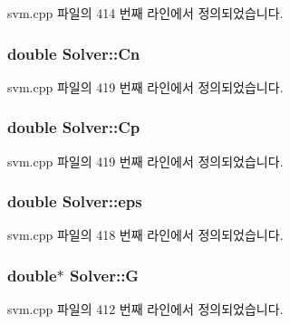 svm.\+cpp 파일의 414 번째 라인에서 정의되었습니다.

\hypertarget{class_solver_a38d741d194839fb445f982dd78e0b97b}{
\subsubsection[{Cn}]{\setlength{\rightskip}{0pt plus 5cm}double Solver\+::\+Cn\hspace{0.3cm}{\ttfamily [protected]}}}\label{class_solver_a38d741d194839fb445f982dd78e0b97b}


svm.\+cpp 파일의 419 번째 라인에서 정의되었습니다.

\hypertarget{class_solver_a2e45dbea8be469bf8247e14768549dd5}{
\subsubsection[{Cp}]{\setlength{\rightskip}{0pt plus 5cm}double Solver\+::\+Cp\hspace{0.3cm}{\ttfamily [protected]}}}\label{class_solver_a2e45dbea8be469bf8247e14768549dd5}


svm.\+cpp 파일의 419 번째 라인에서 정의되었습니다.

\hypertarget{class_solver_a718333cc2c1d40abf9c292a788cba1e5}{
\subsubsection[{eps}]{\setlength{\rightskip}{0pt plus 5cm}double Solver\+::eps\hspace{0.3cm}{\ttfamily [protected]}}}\label{class_solver_a718333cc2c1d40abf9c292a788cba1e5}


svm.\+cpp 파일의 418 번째 라인에서 정의되었습니다.

\hypertarget{class_solver_ad8ab27068f2e045591970aae1201afe9}{
\subsubsection[{G}]{\setlength{\rightskip}{0pt plus 5cm}double$\ast$ Solver\+::\+G\hspace{0.3cm}{\ttfamily [protected]}}}\label{class_solver_ad8ab27068f2e045591970aae1201afe9}


svm.\+cpp 파일의 412 번째 라인에서 정의되었습니다.

